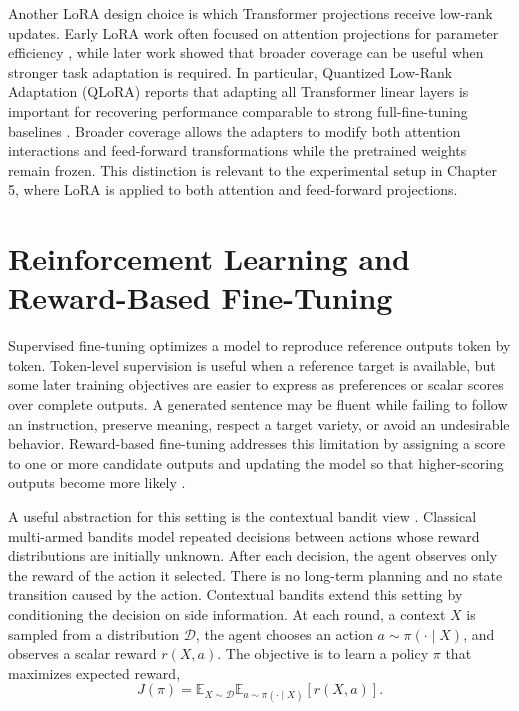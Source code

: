 Another LoRA design choice is which Transformer projections receive low-rank
updates. Early LoRA work often focused on attention projections for parameter
efficiency \citep{hu2022lora}, while later work showed that broader coverage
can be useful when stronger task adaptation is required. In particular,
Quantized Low-Rank Adaptation (QLoRA)
reports that adapting all Transformer linear layers is important for recovering
performance comparable to strong full-fine-tuning baselines
\citep{NEURIPS2023_1feb8787}. Broader coverage allows the adapters to modify
both attention interactions and feed-forward transformations while the
pretrained weights remain frozen. This distinction is relevant to the
experimental setup in Chapter 5, where LoRA is applied to both attention and
feed-forward projections.



\section{Reinforcement Learning and Reward-Based Fine-Tuning}
\label{sec:rl-reward-ft}

Supervised fine-tuning optimizes a model to reproduce reference outputs token
by token. Token-level supervision is useful when a reference target is
available, but some later training objectives are easier to express as
preferences or scalar scores over complete outputs. A generated sentence may be
fluent while failing to follow an instruction, preserve meaning, respect a
target variety, or avoid an undesirable behavior. Reward-based fine-tuning
addresses this limitation by assigning a score to one or more candidate outputs
and updating the model so that higher-scoring outputs become more likely
\citep{10.5555/3600270.3602281}.

A useful abstraction for this setting is the contextual bandit view
\citep{10.5555/3312046,Lattimore_Szepesvári_2020}. Classical multi-armed
bandits model repeated decisions between actions whose reward distributions are
initially unknown. After each decision, the agent observes only the reward of
the action it selected. There is no long-term planning and no state transition
caused by the action. Contextual bandits extend this setting by conditioning
the decision on side information. At each round, a context \(X\) is sampled from
a distribution \(\mathcal{D}\), the agent chooses an action
\(a \sim \pi(\cdot \mid X)\), and observes a scalar reward \(r(X,a)\). The
objective is to learn a policy \(\pi\) that maximizes expected reward,
\begin{equation}
J(\pi) =
\mathbb{E}_{X \sim \mathcal{D}}
\mathbb{E}_{a \sim \pi(\cdot \mid X)}
\left[r(X,a)\right].
\end{equation}

